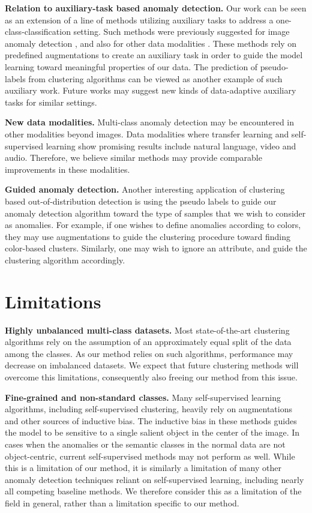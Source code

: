 \documentclass[runningheads]{llncs}
\begin{document}
\textbf{Relation to auxiliary-task based anomaly detection.} Our work can be seen as an extension of a line of methods utilizing auxiliary tasks to address a one-class-classification setting. Such methods were previously suggested for image anomaly detection \cite{golan2018deep}\cite{hendrycks2019using}, and also for other data modalities \cite{bergman2020classification}. These methods rely on predefined augmentations to create an auxiliary task in order to guide the model learning toward meaningful properties of our data. The prediction of pseudo-labels from clustering algorithms can be viewed as another example of such auxiliary work. Future works may suggest new kinds of data-adaptive auxiliary tasks for similar settings.

\textbf{New data modalities.} Multi-class anomaly detection may be encountered in other modalities beyond images. Data modalities where transfer learning and self-supervised learning show promising results include natural language, video and audio. Therefore, we believe similar methods may provide comparable improvements in these modalities. 

\textbf{Guided anomaly detection.} Another interesting application of clustering based out-of-distribution detection is using the pseudo labels to guide our anomaly detection algorithm toward the type of samples that we wish to consider as anomalies. For example, if one wishes to define anomalies according to colors, they may use augmentations to guide the clustering procedure toward finding color-based clusters. Similarly, one may wish to ignore an attribute, and guide the clustering algorithm accordingly.


\section{Limitations}
\label{sec:limitation}
\textbf{Highly unbalanced multi-class datasets.} Most state-of-the-art clustering algorithms rely on the assumption of an approximately equal split of the data among the classes. As our method relies on such algorithms, performance may decrease on imbalanced datasets. We expect that future clustering methods will overcome this limitations, consequently also freeing our method from this issue.

\textbf{Fine-grained and non-standard classes.} Many self-supervised learning algorithms, including self-supervised clustering, heavily rely on augmentations and other sources of inductive bias. The inductive bias in these methods guides the model to be sensitive to a single salient object in the center of the image. In cases when the anomalies or the semantic classes in the normal data are not object-centric, current self-supervised methods may not perform as well. While this is a limitation of our method, it is similarly a limitation of many other anomaly detection techniques reliant on self-supervised learning, including nearly all competing baseline methods. We therefore consider this as a limitation of the field in general, rather than a limitation specific to our method.
\end{document}

